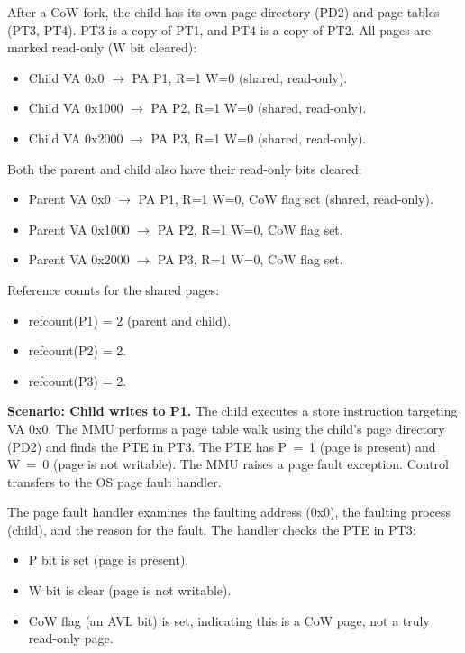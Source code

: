 \documentclass[11pt]{article}
\begin{document}
After a CoW fork, the child has its own page directory (PD2) and page tables (PT3, PT4). PT3 is a copy of PT1, and PT4 is a copy of PT2. All pages are marked read-only (W bit cleared):

\begin{itemize}
    \item Child VA 0x0 $\rightarrow$ PA P1, R=1 W=0 (shared, read-only).
    \item Child VA 0x1000 $\rightarrow$ PA P2, R=1 W=0 (shared, read-only).
    \item Child VA 0x2000 $\rightarrow$ PA P3, R=1 W=0 (shared, read-only).
\end{itemize}

Both the parent and child also have their read-only bits cleared:
\begin{itemize}
    \item Parent VA 0x0 $\rightarrow$ PA P1, R=1 W=0, CoW flag set (shared, read-only).
    \item Parent VA 0x1000 $\rightarrow$ PA P2, R=1 W=0, CoW flag set.
    \item Parent VA 0x2000 $\rightarrow$ PA P3, R=1 W=0, CoW flag set.
\end{itemize}

Reference counts for the shared pages:
\begin{itemize}
    \item refcount(P1) = 2 (parent and child).
    \item refcount(P2) = 2.
    \item refcount(P3) = 2.
\end{itemize}

\textbf{Scenario: Child writes to P1.} The child executes a store instruction targeting VA 0x0. The MMU performs a page table walk using the child's page directory (PD2) and finds the PTE in PT3. The PTE has P~=~1 (page is present) and W~=~0 (page is not writable). The MMU raises a page fault exception. Control transfers to the OS page fault handler.

The page fault handler examines the faulting address (0x0), the faulting process (child), and the reason for the fault. The handler checks the PTE in PT3:
\begin{itemize}
    \item P bit is set (page is present).
    \item W bit is clear (page is not writable).
    \item CoW flag (an AVL bit) is set, indicating this is a CoW page, not a truly read-only page.
\end{itemize}
\end{document}

